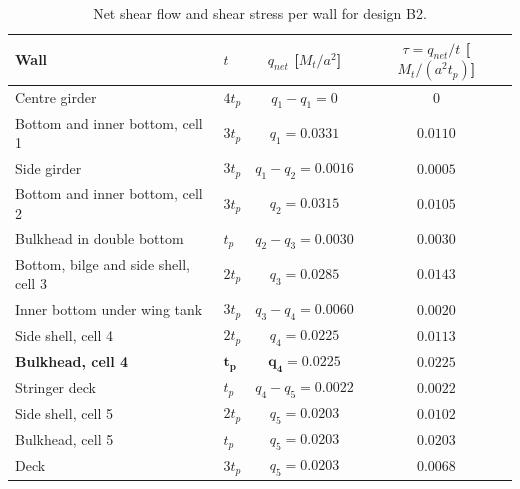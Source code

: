 \begin{table}[H]
  \centering
  \caption{Net shear flow and shear stress per wall for design B2.}
  \label{tab:B2walls}
  \begin{tabular}{llcc}
    \toprule
    Wall & $t$ & $q_{net}$ [$M_t/a^2$] & $\tau = q_{net}/t$ [$M_t/(a^2t_p)$] \\
    \midrule
    Centre girder                           & $4t_p$ & $q_1-q_1 = 0$             & $0$ \\
    Bottom and inner bottom, cell 1         & $3t_p$ & $q_1 = 0.0331$            & $0.0110$ \\
    Side girder                             & $3t_p$ & $q_1-q_2 = 0.0016$        & $0.0005$ \\
    Bottom and inner bottom, cell 2         & $3t_p$ & $q_2 = 0.0315$            & $0.0105$ \\
    Bulkhead in double bottom               & $t_p$  & $q_2-q_3 = 0.0030$        & $0.0030$ \\
    Bottom, bilge and side shell, cell 3    & $2t_p$ & $q_3 = 0.0285$            & $0.0143$ \\
    Inner bottom under wing tank            & $3t_p$ & $q_3-q_4 = 0.0060$        & $0.0020$ \\
    Side shell, cell 4                      & $2t_p$ & $q_4 = 0.0225$            & $0.0113$ \\
    \textbf{Bulkhead, cell 4}               & $\boldsymbol{t_p}$ & $\boldsymbol{q_4 = 0.0225}$ & $\boldsymbol{0.0225}$ \\
    Stringer deck                           & $t_p$  & $q_4-q_5 = 0.0022$        & $0.0022$ \\
    Side shell, cell 5                      & $2t_p$ & $q_5 = 0.0203$            & $0.0102$ \\
    Bulkhead, cell 5                        & $t_p$  & $q_5 = 0.0203$            & $0.0203$ \\
    Deck                                    & $3t_p$ & $q_5 = 0.0203$            & $0.0068$ \\
    \bottomrule
  \end{tabular}
\end{table}

